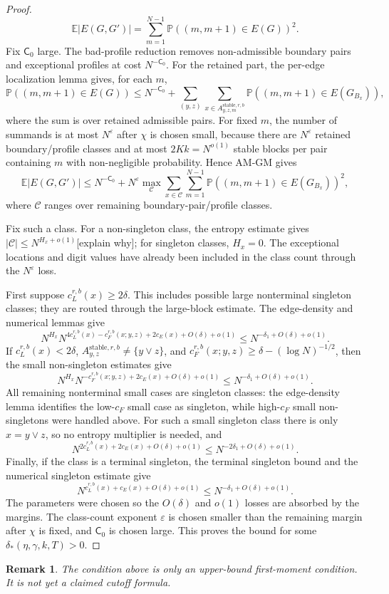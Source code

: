 \documentclass[11pt]{article}
\newtheorem{rmk}{Remark}
\newcommand{\E}{\mathbb E}
\newcommand{\Pbb}{\mathbb P}
\newcommand{\stable}{\mathrm{stable}}
\newcommand{\jscomment}[1]{\textup{\textsf{\color{blue}[#1]}}}
\begin{document}
\begin{proof}
\[
    \E |E(G,G')|
    =
    \sum_{m=1}^{N-1}\Pbb((m,m+1)\in E(G))^2 .
\]
Fix \(\mathsf C_0\) large. The bad-profile reduction removes
non-admissible boundary pairs and exceptional profiles at cost
\(N^{-\mathsf C_0}\). For the retained part, the per-edge localization
lemma gives, for each \(m\),
\[
    \Pbb((m,m+1)\in E(G))
    \le
    N^{-\mathsf C_0}
    +\sum_{(y,z)}
    \sum_{x\in A_{y,z,m}^{\stable,r,b}}
    \Pbb((m,m+1)\in E(G_{B_x})),
\]
where the sum is over retained admissible pairs. For fixed \(m\), the
number of summands is at most \(N^\varepsilon\) after \(\chi\) is chosen
small, because there are \(N^\varepsilon\) retained boundary/profile
classes and at most \(2Kk=N^{o(1)}\) stable blocks per pair containing
\(m\) with non-negligible probability. Hence AM-GM gives
\[
    \E |E(G,G')|
    \le
    N^{-\mathsf C_0}
    +
    N^\varepsilon
    \max_{\mathcal C}
    \sum_{x\in\mathcal C}
    \sum_{m=1}^{N-1}
    \Pbb((m,m+1)\in E(G_{B_x}))^2 ,
\]
where \(\mathcal C\) ranges over remaining boundary-pair/profile classes.

Fix such a class. For a non-singleton class, the entropy estimate gives
\(|\mathcal C|\le N^{H_x+o(1)}\)\jscomment{explain why}; for singleton classes, \(H_x=0\). The
exceptional locations and digit values have already been included in the
class count through the \(N^\varepsilon\) loss.

First suppose \(c_L^{r,b}(x)\ge2\delta\). This includes possible large
nonterminal singleton classes; they are routed through the large-block
estimate. The edge-density and numerical lemmas give
\[
    N^{H_x}
    N^{4c_L^{r,b}(x)-c_F^{r,b}(x;y,z)+2c_E(x)+O(\delta)+o(1)}
    \le N^{-\delta_1+O(\delta)+o(1)}.
\]
If \(c_L^{r,b}(x)<2\delta\), \(A_{y,z}^{\stable,r,b}\ne\{y\vee z\}\),
and \(c_F^{r,b}(x;y,z)\ge\delta-(\log N)^{-1/2}\), then the small
non-singleton estimates give
\[
    N^{H_x}
    N^{-c_F^{r,b}(x;y,z)+2c_E(x)+O(\delta)+o(1)}
    \le N^{-\delta_1+O(\delta)+o(1)}.
\]
All remaining nonterminal small cases are singleton classes: the
edge-density lemma identifies the low-\(c_F\) small case as singleton,
while high-\(c_F\) small non-singletons were handled above. For such a
small singleton class there is only \(x=y\vee z\), so no entropy
multiplier is needed, and
\[
    N^{2c_L^{r,b}(x)+2c_E(x)+O(\delta)+o(1)}
    \le N^{-2\delta_1+O(\delta)+o(1)}.
\]
Finally, if the class is a terminal singleton, the terminal singleton
bound and the numerical singleton estimate give
\[
    N^{c_L^{r,b}(x)+c_E(x)+O(\delta)+o(1)}
    \le N^{-\delta_1+O(\delta)+o(1)}.
\]
The parameters were chosen so the \(O(\delta)\) and \(o(1)\) losses are
absorbed by the margins. The class-count exponent \(\varepsilon\) is
chosen smaller than the remaining margin after \(\chi\) is fixed, and
\(\mathsf C_0\) is chosen large. This proves the bound for some
\(\delta_*(\eta,\gamma,k,T)>0\).
\end{proof}

\begin{rmk}
The condition above is only an upper-bound first-moment condition. It is not yet a claimed cutoff formula.
\end{rmk}
\end{document}
